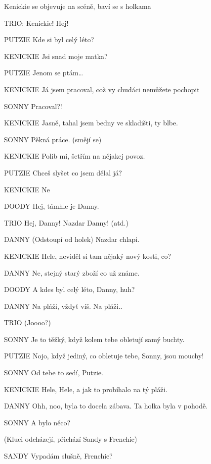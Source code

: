 \pop Kenickie se objevuje na scéně, baví se s holkama

\rep TRIO:        Kenickie! Hej!

\bye
PUTZIE        Kde si byl celý léto?

KENICKIE        Jsi snad moje matka?

PUTZIE        Jenom se ptám…

KENICKIE        Já jsem pracoval, což vy chudáci nemůžete pochopit

SONNY        Pracoval?!

KENICKIE                Jasně, tahal jsem bedny ve skladišti, ty blbe.

SONNY                Pěkná práce. (smějí se)

KENICKIE                Polib mi, šetřím na nějakej povoz.

PUTZIE                Chceš slyšet co jsem dělal já?

KENICKIE                 Ne

DOODY                Hej, támhle je Danny.

TRIO                Hej, Danny! Nazdar Danny! (atd.)

DANNY                (Odstoupí od holek) Nazdar chlapi. 

KENICKIE                Hele, neviděl si tam nějaký nový kosti, co?

DANNY                Ne, stejný starý zboží co už známe.

DOODY                A kdes byl celý léto, Danny, huh?

DANNY                Na pláži, vždyť víš. Na pláži..

TRIO                (Joooo?)

SONNY                Je to těžký, když kolem tebe obletují samý buchty.

PUTZIE                Nojo, když jediný, co obletuje tebe, Sonny, jsou mouchy!

SONNY                Od tebe to sedí, Putzie.

KENICKIE                Hele, Hele, a jak to probíhalo na tý pláži. 

DANNY                Ohh, noo, byla to docela zábava. Ta holka byla v pohodě.

SONNY                A bylo něco?

(Kluci odcházejí, přichází Sandy s Frenchie)





SANDY                Vypadám slušně, Frenchie?

